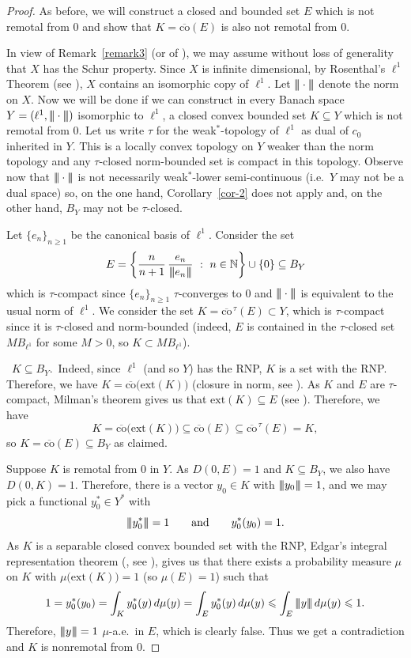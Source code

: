 \documentclass[11pt,a4paper]{amsart}
\theoremstyle{plain}
\theoremstyle{definition}
\newcommand{\extr}{\ensuremath{\mathrm{ext}}}
\newcommand{\cconv}{\overline{\mathrm{co}}}
\newcommand{\N}{\ensuremath{\mathbb{N}}}
\newcommand{\tri} {\vert \hspace{-1.5pt} \vert  \hspace{-1.5pt} \vert }
\renewcommand{\leq}{\leqslant}
\renewcommand{\geq}{\geqslant}
\begin{document}
\begin{proof}
As before, we will construct a closed and bounded set $E$ which is
not remotal from $0$ and show that $K = \cconv(E)$ is also not
remotal from $0$.

In view of Remark~\ref{remark3} (or of \cite{R}), we may assume
without loss of generality that $X$ has the Schur property. Since
$X$ is infinite dimensional, by Rosenthal's $\ell^1$ Theorem (see
\cite[\S~XI]{D}), $X$ contains an isomorphic copy of $\ell^1$. Let
$\tri\cdot\tri$ denote the norm on $X$. Now we will be done if
we can construct in every Banach space $Y=(\ell^1,\tri\cdot\tri)$
isomorphic to $\ell^1$, a closed convex bounded set $K\subseteq Y$
which is not remotal from $0$. Let us write $\tau$ for the
weak$^\ast$-topology of $\ell^1$ as dual of $c_0$ inherited in $Y$.
This is a locally convex topology on $Y$ weaker than the norm
topology and any $\tau$-closed norm-bounded set is compact in this
topology. Observe now that $\tri\cdot\tri$ is not necessarily
weak$^\ast$-lower semi-continuous (i.e.\ $Y$ may not be a dual
space) so, on the one hand, Corollary~\ref{cor-2} does not apply
and, on the other hand, $B_Y$ may not be $\tau$-closed.

Let $\{e_n\}_{n\geq 1}$ be the canonical basis of $\ell^1$.
Consider the set
$$
E =\left\{\frac{n}{n+1}\,\frac{e_n}{\tri e_n\tri }\ : \ n\in \N\right\} \cup \{0\}
\subseteq B_Y
$$
which is $\tau$-compact since $\{e_n\}_{n\geq 1}$ $\tau$-converges
to $0$ and $\tri\cdot\tri$ is equivalent to the usual norm of
$\ell^1$. We consider the set $K = \cconv^{\,\tau}(E) \subset Y$,
which is $\tau$-compact since it is $\tau$-closed and norm-bounded
(indeed, $E$ is contained in the $\tau$-closed set $M B_{\ell^1}$
for some $M>0$, so $K\subset M B_{\ell^1}$).

\ $K\subseteq B_Y$.\ Indeed, since
$\ell^1$ (and so $Y$) has the RNP, $K$ is a set with the RNP.
Therefore, we have $K = \cconv\bigl(\extr(K)\bigr)$ (closure in
norm, see \cite[\S~3]{Bourgin}). As $K$ and $E$ are
$\tau$-compact, Milman's theorem gives us that $\extr(K) \subseteq
E$ (see \cite[p.~151]{D}). Therefore, we have
$$
K=\cconv\bigl(\extr(K)\bigr) \subseteq \cconv(E)\subseteq
\cconv^{\,\tau}(E)=K,
$$
so $K=\cconv(E)\subseteq B_Y$ as claimed.

Suppose $K$ is remotal from $0$ in $Y$. As $D(0,E)=1$ and
$K\subseteq B_Y$, we also have $D(0,K)=1$. Therefore, there is a
vector $y_0\in K$ with $\tri y_0\tri=1$, and we may pick a
functional $y_0^\ast\in Y^\ast$ with
$$
\tri y_0^\ast\tri=1 \qquad \text{and} \qquad y_0^\ast(y_0)=1.
$$
As $K$ is a separable closed convex bounded set with the RNP,
Edgar's integral representation theorem (\cite{E}, see
\cite[Theorem~16.12]{Phelps}), gives us that there exists a
probability measure $\mu$ on $K$ with $\mu\bigl(\extr(K)\bigr)=1$
(so $\mu(E)=1$) such that
$$
1=y_0^\ast(y_0)=\int_{K} y_0^\ast(y)
\,d\mu(y)= \int_{E} y_0^\ast(y)
\,d\mu(y) \leq \int_{E}\tri y\tri
\,d\mu(y)\leq 1.
$$
Therefore, $\tri y \tri=1$ $\mu$-a.e.\ in $E$, which is clearly
false. Thus we get a contradiction and $K$ is nonremotal from $0$.
\end{proof}
\end{document}
